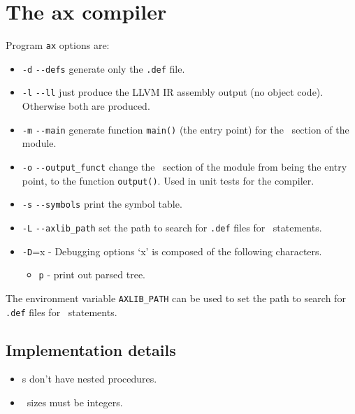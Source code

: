 \documentclass[12pt]{article}
\begin{document}
\newpage
\section{The ax compiler}

Program \lstinline"ax" options are: 
\begin{itemize}
    \item \lstinline"-d" \lstinline"--defs" generate only the \lstinline".def" file.
    \item \lstinline"-l" \lstinline"--ll" just produce the LLVM IR assembly output (no object code). Otherwise both are produced.
    \item \lstinline"-m" \lstinline"--main" generate function \lstinline"main()" (the entry point) for the \BEGIN\ section of the module.
    \item \lstinline"-o" \lstinline"--output_funct" change the \BEGIN\ section of the module from being the entry point, to the function \lstinline"output()". Used in unit tests for the compiler.
    \item  \lstinline"-s" \lstinline"--symbols" print the symbol table.
    \item \lstinline"-L" \lstinline"--axlib_path" set the path to search for \lstinline".def" files for \IMPORT\ statements.
    \item \lstinline"-D"=x - Debugging options `x' is composed of the following characters.
    \begin{itemize}
        \item \lstinline"p" - print out parsed tree.
    \end{itemize}
\end{itemize}

The environment variable \lstinline"AXLIB_PATH" can be used to set the path to search for \lstinline".def" files for \IMPORT\ statements.

\subsection{Implementation details}
\begin{itemize}
    \item \PROCEDURE s don't have nested procedures.
    \item \ARRAY\ sizes must be integers.
\end{itemize}
\end{document}
